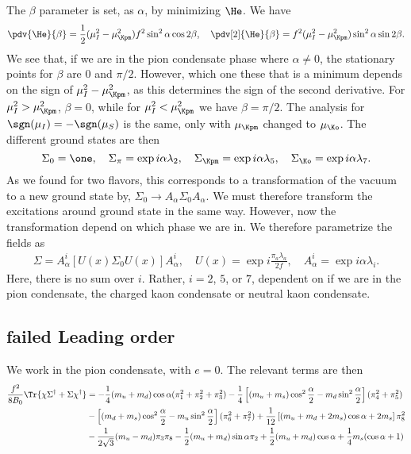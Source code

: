 \documentclass{book}
\begin{document}
The $\beta$ parameter is set, as $\alpha$, by minimizing $\He$.
We have
%
\begin{equation}
    \pdv{\He}{\beta} = \frac{1}{2} (\mu_I^2 - \mu_\Kpm^2) f^2 \sin^2\alpha\cos2\beta, \quad
    \pdv[2]{\He}{\beta} = f^2 (\mu_I^2 - \mu_\Kpm^2) \sin^2\alpha\sin2\beta.
\end{equation}
%
We see that, if we are in the pion condensate phase where $\alpha \neq 0$, the stationary points for $\beta$ are $0$ and $\pi/2$.
However, which one these that is a minimum depends on the sign of $\mu_I^2 - \mu_\Kpm^2$, as this determines the sign of the second derivative.
For $\mu_I^2 > \mu_\Kpm^2$, $\beta = 0$, while for $\mu_I^2 < \mu_\Kpm^2$ we have $\beta = \pi/2$.
The analysis for $\sgn(\mu_I) = -\sgn(\mu_S)$ is the same, only with $\mu_\Kpm$ changed to $\mu_\Ko$.
The different ground states are then
%
\begin{equation}
    \Sigma_0 = \one, \quad
    \Sigma_\pi = \exp{i\alpha \lambda_2}, \quad
    \Sigma_\Kpm = \exp{i\alpha \lambda_5}, \quad
    \Sigma_\Ko = \exp{i\alpha \lambda_7}.
\end{equation}
%
As we found for two flavors, this corresponds to a transformation of the vacuum to a new ground state by, $\Sigma_0 \rightarrow A_\alpha \Sigma_0 A_\alpha$.
We must therefore transform the excitations around ground state in the same way.
However, now the transformation depend on which phase we are in.
We therefore parametrize the fields as
%
\begin{align}
    \Sigma = A^i_\alpha [U(x) \Sigma_0 U(x)] A_\alpha^i, \quad
    U(x) = \exp{i \frac{\pi_a \lambda_a}{2 f}}, \quad
    A_\alpha^i = \exp{i \alpha \lambda_i}.
\end{align}
%
Here, there is no sum over $i$.
Rather, $i = 2$, $5$, or $7$, dependent on if we are in the pion condensate, the charged kaon condensate or neutral kaon condensate.


\subsection{failed Leading order}


We work in the pion condensate, with $e = 0$.
The relevant terms are then
%
\begin{align}
    \nonumber
    \frac{f^2}{8B_0}\Tr{\chi \Sigma^\dagger + \Sigma \chi^\dagger}
    & =
    - \frac{1}{4}(m_u + m_d)\cos\alpha (\pi_1^2 + \pi_2^2 + \pi_3^2)
    - \frac{1}{4} 
    \left[
        (m_u + m_s)\cos^2\frac{\alpha}{2} - m_d \sin^2\frac{\alpha}{2}
    \right](\pi_4^2 + \pi_5^2)\\ \nonumber
    &- 
    \left[
        (m_d + m_s)\cos^2\frac{\alpha}{2} - m_u \sin^2\frac{\alpha}{2}
    \right](\pi_6^2 + \pi_7^2) 
    + \frac{1}{12} 
    \left[
        (m_u + m_d + 2m_s) \cos\alpha + 2m_s
    \right] \pi_8^2 \\
    &-\frac{1}{2 \sqrt{3}} (m_u - m_d) \pi_3 \pi_8
    - \frac{1}{2}(m_u + m_d)\sin\alpha \pi_2
    + \frac{1}{2}(m_u + m_d)\cos\alpha + \frac{1}{4}m_s(\cos\alpha + 1)
\end{align}
\end{document}
